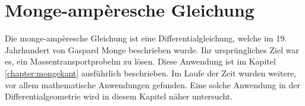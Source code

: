 %
%
%
%
\chapter{Monge-ampèresche Gleichung\label{chapter:mongeampere}}
\begin{refsection}

Die monge-ampèresche Gleichung ist eine Differentialgleichung, welche
im 19. Jahrhundert von Gaspard Monge beschrieben wurde. 
Ihr ursprüngliches Ziel war es, ein Massentransportprobelm zu lösen. 
Diese Anwendung ist im Kapitel \ref{chapter:mongekant} ausführlich beschrieben.
Im Laufe der Zeit wurden weitere, vor allem mathematische Anwendungen
gefunden.
Eine solche Anwendung in der Differentialgeometrie wird in diesem Kapitel näher 
untersucht.




% 

\printbibliography[heading=subbibliography]
\end{refsection}
